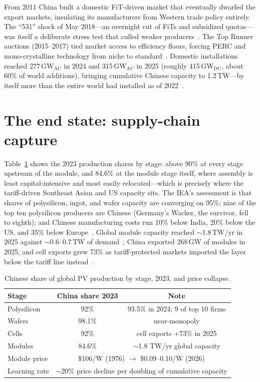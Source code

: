 From 2011 China built a domestic FiT-driven market that eventually dwarfed the export markets, insulating its manufacturers from Western trade policy entirely. The ``531'' shock of May 2018---an overnight cut of FiTs and subsidized quotas---was itself a deliberate stress test that culled weaker producers~\cite{policy531}. The Top Runner auctions (2015--2017) tied market access to efficiency floors, forcing PERC and mono-crystalline technology from niche to standard~\cite{toprunner}. Domestic installations reached 277\,GW$_{\mathrm{AC}}$ in 2024 and 315\,GW$_{\mathrm{AC}}$ in 2025 (roughly 415\,GW$_{\mathrm{DC}}$, about 60\% of world additions), bringing cumulative Chinese capacity to 1.2\,TW---by itself more than the entire world had installed as of 2022~\cite{china-2024-installs,china-2025-installs}.

\section{The end state: supply-chain capture}

Table~\ref{tab:solar-shares} shows the 2023 production shares by stage: above 90\% at every stage upstream of the module, and 84.6\% at the module stage itself, where assembly is least capital-intensive and most easily relocated---which is precisely where the tariff-driven Southeast Asian and US capacity sits. The IEA's assessment is that shares of polysilicon, ingot, and wafer capacity are converging on 95\%; nine of the top ten polysilicon producers are Chinese (Germany's Wacker, the survivor, fell to eighth); and Chinese manufacturing costs run 10\% below India, 20\% below the US, and 35\% below Europe~\cite{iea-supply,poly-2024}. Global module capacity reached $\sim$1.8\,TW/yr in 2025 against $\sim$0.6--0.7\,TW of demand~\cite{module-capacity}; China exported 268\,GW of modules in 2025, and cell exports grew 73\% as tariff-protected markets imported the layer below the tariff line instead~\cite{infolink-2025,ember-cells}.

\begin{table}[htbp]
  \centering
  \caption{Chinese share of global PV production by stage, 2023, and price collapse.}
  \label{tab:solar-shares}
  \begin{tabular}{lcc}
    \toprule
    Stage & China share 2023 & Note \\
    \midrule
    Polysilicon & 92\% & 93.5\% in 2024; 9 of top 10 firms \\
    Wafers & 98.1\% & near-monopoly \\
    Cells & 92\% & cell exports +73\% in 2025 \\
    Modules & 84.6\% & $\sim$1.8 TW/yr global capacity \\
    \midrule
    Module price & \multicolumn{2}{c}{\$106/W (1976) $\rightarrow$ \$0.09--0.10/W (2026)} \\
    Learning rate & \multicolumn{2}{c}{$\sim$20\% price decline per doubling of cumulative capacity} \\
    \bottomrule
  \end{tabular}
\end{table}

